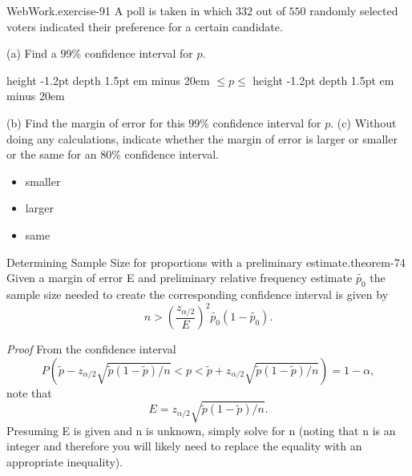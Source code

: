 \documentclass[10pt,]{book}
\makeatletter
\newcommand{\fillin}[1]{\leavevmode\leaders\vrule height -1.2pt depth 1.5pt \hskip #1em minus #1em \null}
\renewcommand*{\proofname}{Proof}
\renewenvironment{proof}[1][\proofname]{\par
  \pushQED{\qed}%
  \normalfont \topsep6\p@\@plus6\p@\relax
  \trivlist
  \item\relax
    {\itshape
    #1\@addpunct{.}}\hspace\labelsep\ignorespaces
}{%
  \popQED\endtrivlist\@endpefalse
}
\numberwithin{equation}{section}
\newcommand{\lt}{<}
\newcommand{\gt}{>}
\makeatother
\begin{document}
%
\par
\hypertarget{p-1360}{}%
\begin{inlineexercise}{WebWork.}{exercise-91}%
\hypertarget{p-1361}{}%
A poll is taken in which \(332\) out of \(550\) randomly selected voters indicated their preference for a certain candidate.%
\par
\hypertarget{p-1362}{}%
(a) Find a \(99\)\% confidence interval for \(p\).%
\par
\hypertarget{p-1363}{}%
 \fillin{20} \(\leq p \leq\)  \fillin{20}%
\par
\hypertarget{p-1364}{}%
(b) Find the margin of error for this \(99\)\% confidence interval for \(p\).%
\hypertarget{p-1366}{}%
(c) Without doing any calculations, indicate whether the margin of error is larger or smaller or the same for an 80\% confidence interval. \par
\begin{itemize}[label=$\odot$,leftmargin=3em,]
\item{}\hypertarget{p-1367}{}%
smaller%

\item{}\hypertarget{p-1368}{}%
larger%

\item{}\hypertarget{p-1369}{}%
same%

\end{itemize}
%
\end{inlineexercise}
%
\par
\hypertarget{p-1370}{}%
\begin{theorem}{Determining Sample Size for proportions with a preliminary estimate.}{}{theorem-74}%
\hypertarget{p-1371}{}%
Given a margin of error E and preliminary relative frequency estimate \(\tilde{p_0}\) the sample size needed to create the corresponding confidence interval is given by%
\begin{equation*}
n \gt \left ( \frac{z_{\alpha /2}}{E} \right )^2 \tilde{p_0}(1-\tilde{p_0}).
\end{equation*}
%
\end{theorem}
\begin{proof}\hypertarget{proof-74}{}
\hypertarget{p-1372}{}%
From the confidence interval%
\begin{equation*}
P( \tilde{p} - z_{ \alpha/2}\sqrt{\tilde{p}(1-\tilde{p})/n} \lt  p \lt \tilde{p} + z_{ \alpha/2}\sqrt{\tilde{p}(1-\tilde{p})/n}) = 1 - \alpha,
\end{equation*}
note that%
\begin{equation*}
E = z_{ \alpha/2}\sqrt{\tilde{p}(1-\tilde{p})/n}.
\end{equation*}
Presuming E is given and n is unknown, simply solve for n (noting that n is an integer and therefore you will likely need to replace the equality with an appropriate inequality).%
\end{proof}
\end{document}
